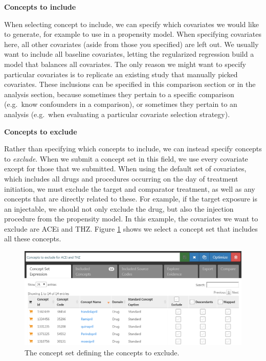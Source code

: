 \documentclass[11pt]{book}
\theoremstyle{definition}
\theoremstyle{definition}
\theoremstyle{definition}
\theoremstyle{remark}
\begin{document}
\textbf{Concepts to include}

When selecting concept to include, we can specify which covariates we would like to generate, for example to use in a propensity model. When specifying covariates here, all other covariates (aside from those you specified) are left out. We usually want to include all baseline covariates, letting the regularized regression build a model that balances all covariates. The only reason we might want to specify particular covariates is to replicate an existing study that manually picked covariates. These inclusions can be specified in this comparison section or in the analysis section, because sometimes they pertain to a specific comparison (e.g.~know confounders in a comparison), or sometimes they pertain to an analysis (e.g.~when evaluating a particular covariate selection strategy).

\textbf{Concepts to exclude}

Rather than specifying which concepts to include, we can instead specify concepts to \emph{exclude}. When we submit a concept set in this field, we use every covariate except for those that we submitted. When using the default set of covariates, which includes all drugs and procedures occurring on the day of treatment initiation, we must exclude the target and comparator treatment, as well as any concepts that are directly related to these. For example, if the target exposure is an injectable, we should not only exclude the drug, but also the injection procedure from the propensity model. In this example, the covariates we want to exclude are ACEi and THZ. Figure \ref{fig:covsToExclude} shows we select a concept set that includes all these concepts.

\begin{figure}

{\centering \includegraphics[width=1\linewidth]{images/PopulationLevelEstimation/covsToExclude} 

}

\caption{The concept set defining the concepts to exclude.}\label{fig:covsToExclude}
\end{figure}
\end{document}

